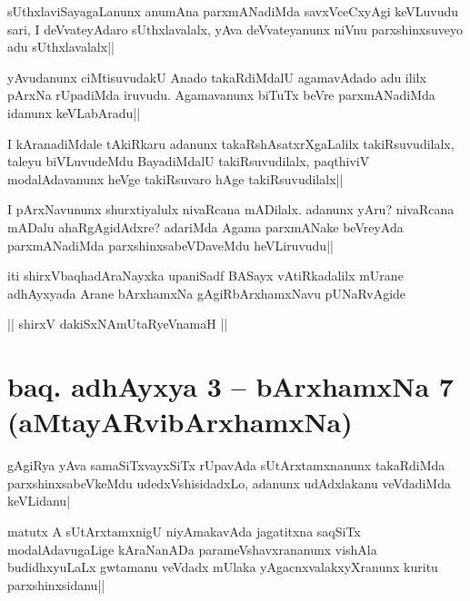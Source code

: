 \begin{artha}
sUthxlaviSayagaLanunx anumAna parxmANadiMda savxVceCxyAgi keVLuvudu sari, I deVvateyAdaro sUthxlavalalx, yAva deVvateyanunx niVnu parxshinxsuveyo adu sUthxlavalalx||
\end{artha}

\begin{artha}
yAvudanunx ciMtisuvudakU Anado takaRdiMdalU agamavAdado adu ililx pArxNa rUpadiMda iruvudu. Agamavanunx biTuTx beVre parxmANadiMda idanunx keVLabAradu|| 
\end{artha}

\begin{artha}%
I kAranadiMdale tAkiRkaru adanunx takaRshAsatxrXgaLalilx takiRsuvudilalx, taleyu biVLuvudeMdu BayadiMdalU takiRsuvudilalx, paqthiviV modalAdavanunx heVge takiRsuvaro hAge takiRsuvudilalx||
\end{artha}

\begin{artha}
I pArxNavununx shurxtiyalulx nivaRcana mADilalx. adanunx yAru? nivaRcana mADalu ahaRgAgidAdxre? adariMda Agama parxmANake beVreyAda parxmANadiMda parxshinxsabeVDaveMdu heVLiruvudu||
\end{artha}

\begin{center}
iti shirxVbaqhadAraNayxka upaniSadf BASayx vAtiRkadalilx mUrane adhAyxyada Arane bArxhamxNa gAgiRbArxhamxNavu pUNaRvAgide
\end{center}

\begin{center}%
|| shirxV dakiSxNAmUtaRyeVnamaH ||
\end{center}

\section*{baq. adhAyxya 3 -- bArxhamxNa 7 (aMtayARvibArxhamxNa)}

\begin{artha}
gAgiRya yAva samaSiTxvayxSiTx rUpavAda sUtArxtamxnanunx takaRdiMda parxshinxsabeVkeMdu udedxVshisidadxLo, adanunx udAdxlakanu veVdadiMda keVLidanu|
\end{artha}

\begin{artha}
matutx A sUtArxtamxnigU niyAmakavAda jagatitxna saqSiTx modalAdavugaLige kAraNanADa parameVshavxrananunx vishAla budidhxyuLaLx gwtamanu veVdadx mUlaka yAgacnxvalakxyXranunx kuritu parxshinxsidanu||
\end{artha}

